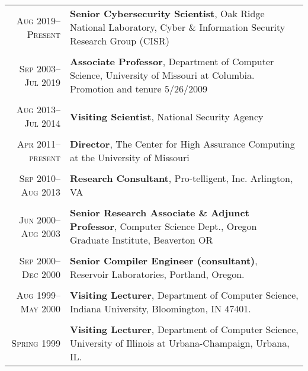 \documentclass[11pt]{article}
\begin{document}
\begin{tabular}{r|p{11cm}}
 
\textsc{Aug 2019--Present} & {\bf Senior Cybersecurity Scientist}, Oak Ridge National Laboratory, Cyber \& Information Security Research Group (CISR)
\\
\multicolumn{2}{c}{}
\\[-1ex]

\textsc{Sep 2003--Jul 2019} & {\bf Associate Professor}, Department of Computer
Science,
University of Missouri at Columbia. Promotion and tenure 5/26/2009
\\
\multicolumn{2}{c}{}
\\[-1ex]


\textsc{Aug 2013--Jul 2014} & {\bf Visiting Scientist}, National Security Agency\\
\multicolumn{2}{c}{}
\\[-1ex]

\textsc{Apr 2011--present} & {\bf Director}, The Center for High Assurance Computing at the University of Missouri
\\
\multicolumn{2}{c}{}
\\[-1ex]


\textsc{Sep 2010--Aug 2013} & {\bf Research Consultant}, Pro-telligent, Inc. 
Arlington, VA
\\
\multicolumn{2}{c}{}
\\[-1ex]

\textsc{Jun 2000--Aug 2003} & {\bf Senior Research Associate \& Adjunct Professor}, Computer
Science Dept.,
Oregon Graduate Institute, Beaverton OR
\\
\multicolumn{2}{c}{}
\\[-1ex]

\textsc{Sep 2000--Dec 2000} & {\bf Senior Compiler Engineer (consultant)}, Reservoir
Laboratories, Portland, Oregon.
\\
\multicolumn{2}{c}{}
\\[-1ex]

\textsc{Aug 1999--May 2000} &
    {\bf Visiting Lecturer}, Department of Computer Science,
	Indiana University, Bloomington, IN 47401.
	\\
	\multicolumn{2}{c}{}
	\\[-1ex]
	
\textsc{Spring 1999} & 
	{\bf Visiting Lecturer}, Department of Computer Science,
	  University of Illinois at Urbana-Champaign, Urbana, IL.
\end{tabular}

\end{document}
